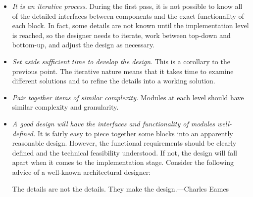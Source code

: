 \begin{itemize}
\item
  \emph{It is an iterative process}. During the first pass, it is not
  possible to know all of the detailed interfaces between components and
  the exact functionality of each block. In fact, some details are not
  known until the implementation level is reached, so the designer needs
  to iterate, work between top-down and bottom-up, and adjust the design
  as necessary.
\item
  \emph{Set aside sufficient time to develop the design}. This is a
  corollary to the previous point. The iterative nature means that it
  takes time to examine different solutions and to refine the details
  into a working solution.
\item
  \emph{Pair together items of similar complexity.} Modules at each
  level should have similar complexity and granularity.
\item
  \emph{A good design will have the interfaces and functionality of
  modules well-defined.} It is fairly easy to piece together some blocks
  into an apparently reasonable design. However, the functional
  requirements should be clearly defined and the technical feasibility
  understood. If not, the design will fall apart when it comes to the
  implementation stage. Consider the following advice of a well-known
  architectural designer:

\begin{itquote}
The details are not the details. They make the design.---Charles Eames
\end{itquote}


\end{itemize}
